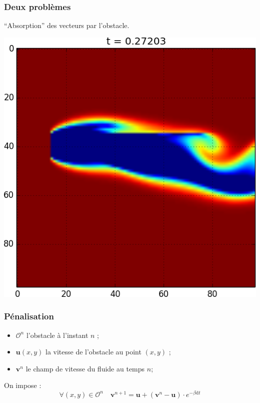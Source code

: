 \documentclass{beamer}
\renewcommand{\O}{\mathcal{O}}
\newcommand{\vect}[1]{\boldsymbol{#1}}
\begin{document}
  \begin{frame}
    \frametitle{Deux problèmes}
    ``Absorption'' des vecteurs par l'obstacle.
    \begin{center}
      \includegraphics[height=0.7\textheight]{absorption.png}
    \end{center}
  \end{frame}

  \begin{frame}
    \frametitle{Pénalisation}
    \begin{itemize}
    \item $\O^n$ l'obstacle à l'instant $n$ ;
    \item $\vect{u}(x,y)$ la vitesse de l'obstacle au point $(x,y)$ ;
    \item $\vect{v}^n$ le champ de vitesse du fluide au temps $n$;
    \end{itemize}
    \bigskip
    On impose :
    \[ \forall (x,y) \in \O^n \quad \vect{v}^{n+1} = \vect{u} + 
    (\vect{v}^n - \vect{u}) \cdot e^{-\beta \mathrm{d} t} \]
  \end{frame}
\end{document}
